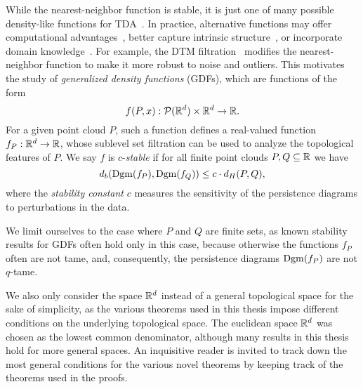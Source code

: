 While the nearest-neighbor function is stable, it is just one of many possible
density-like functions for
TDA~\cite{anai2020dtm,hoefgeest2022christoffeldarbouxkerneltopologicaldata,phillips2015geometricinferencekerneldensity}.
In practice, alternative functions may offer computational
advantages~\cite{guibas2011witnessed,buchet2014efficientrobustpersistenthomology},
better capture intrinsic structure~\cite{anai2020dtm}, or incorporate domain
knowledge~\cite{fractalfract8120731}. For example, the DTM
filtration~\cite{anai2020dtm} modifies the nearest-neighbor function to make
it more robust to noise and outliers. This motivates the study of
\emph{generalized density functions} (GDFs), which are functions of the form
\begin{equation}
    f(P, x) : \mathcal{P}(\mathbb{R}^d) \times \mathbb{R}^d \to \mathbb{R}.
\end{equation}
For a given point cloud $P$, such a function defines a real-valued function
$f_P: \mathbb{R}^d \to \mathbb{R}$, whose sublevel set filtration can be used to analyze the
topological features of $P$. We say $f$ is $c$-\emph{stable} if for all finite
point clouds $P, Q \subseteq \mathbb{R}$ we have
\begin{equation}
    d_b(\operatorname{Dgm}(f_P), \operatorname{Dgm}(f_Q)) \leq c \cdot d_H(P, Q),
\end{equation}
where the \emph{stability constant} $c$ measures the sensitivity of the
persistence diagrams to perturbations in the data.

We limit ourselves to the case where $P$ and $Q$ are finite sets, as known
stability results for GDFs often hold only in this case, because otherwise the
functions $f_P$ often are not tame, and, consequently, the persistence diagrams
$\operatorname{Dgm}(f_P)$ are not $q$-tame.

We also only consider the space $\mathbb{R}^d$ instead of a general topological space
for the sake of simplicity, as the various theorems used in this thesis impose
different conditions on the underlying topological space. The euclidean space
$\mathbb{R}^d$ was chosen as the lowest common denominator, although many results in
this thesis hold for more general spaces. An inquisitive reader is invited to
track down the most general conditions for the various novel theorems by keeping
track of the theorems used in the proofs.

